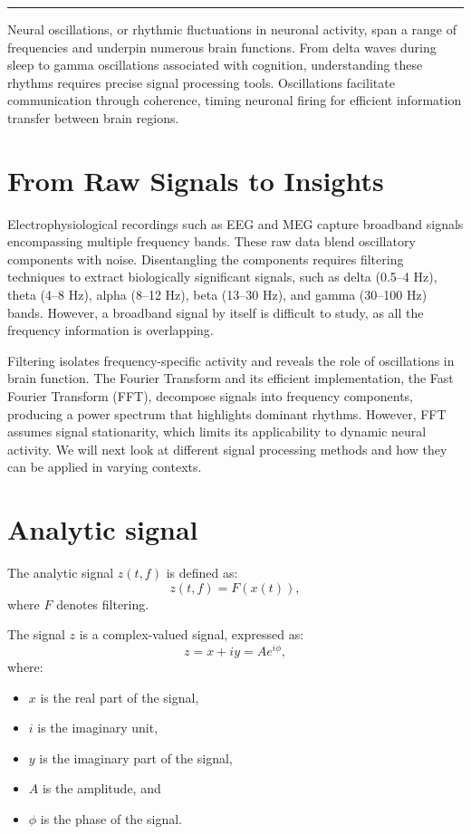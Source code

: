 \rule{\linewidth}{0.4pt} %
\vspace{1pt}           %


Neural oscillations, or rhythmic fluctuations in neuronal activity, span a range of frequencies and underpin numerous brain functions. From delta waves during sleep to gamma oscillations associated with cognition, understanding these rhythms requires precise signal processing tools. Oscillations facilitate communication through coherence, timing neuronal firing for efficient information transfer between brain regions.

\section{From Raw Signals to Insights}
Electrophysiological recordings such as EEG and MEG capture broadband signals encompassing multiple frequency bands. These raw data blend oscillatory components with noise. Disentangling the components requires filtering techniques to extract biologically significant signals, such as delta (0.5--4 Hz), theta (4--8 Hz), alpha (8--12 Hz), beta (13--30 Hz), and gamma (30--100 Hz) bands.
However, a broadband signal by itself is difficult to study, as all the frequency information is overlapping.

Filtering isolates frequency-specific activity and reveals the role of oscillations in brain function. The Fourier Transform and its efficient implementation, the Fast Fourier Transform (FFT), decompose signals into frequency components, producing a power spectrum that highlights dominant rhythms. However, FFT assumes signal stationarity, which limits its applicability to dynamic neural activity. We will next look at different signal processing methods and how they can be applied in varying contexts.

\section{Analytic signal}
The analytic signal \( z(t,f) \) is defined as:
$$
z(t,f) = F(x(t)),
$$
where \( F \) denotes filtering.

The signal \( z \) is a complex-valued signal, expressed as:
$$
z = x + iy = A e^{i \phi},
$$
where:
\begin{itemize}
  \item \( x \) is the real part of the signal,
  \item \( i \) is the imaginary unit,
  \item \( y \) is the imaginary part of the signal,
  \item \( A \) is the amplitude, and
  \item \( \phi \) is the phase of the signal.
\end{itemize}

